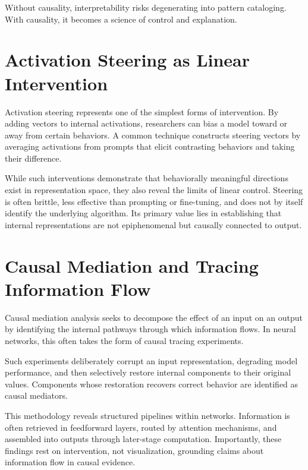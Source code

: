 \documentclass[11pt]{article}
\begin{document}
Without causality, interpretability risks degenerating into pattern cataloging.
With causality, it becomes a science of control and explanation.

\section{Activation Steering as Linear Intervention}

Activation steering represents one of the simplest forms of intervention. By
adding vectors to internal activations, researchers can bias a model toward or
away from certain behaviors. A common technique constructs steering vectors by
averaging activations from prompts that elicit contrasting behaviors and taking
their difference.

While such interventions demonstrate that behaviorally meaningful directions
exist in representation space, they also reveal the limits of linear control.
Steering is often brittle, less effective than prompting or fine-tuning, and
does not by itself identify the underlying algorithm. Its primary value lies in
establishing that internal representations are not epiphenomenal but causally
connected to output.

\section{Causal Mediation and Tracing Information Flow}

Causal mediation analysis seeks to decompose the effect of an input on an output
by identifying the internal pathways through which information flows. In neural
networks, this often takes the form of causal tracing experiments.

Such experiments deliberately corrupt an input representation, degrading model
performance, and then selectively restore internal components to their original
values. Components whose restoration recovers correct behavior are identified as
causal mediators.

This methodology reveals structured pipelines within networks. Information is
often retrieved in feedforward layers, routed by attention mechanisms, and
assembled into outputs through later-stage computation. Importantly, these
findings rest on intervention, not visualization, grounding claims about
information flow in causal evidence.
\end{document}
